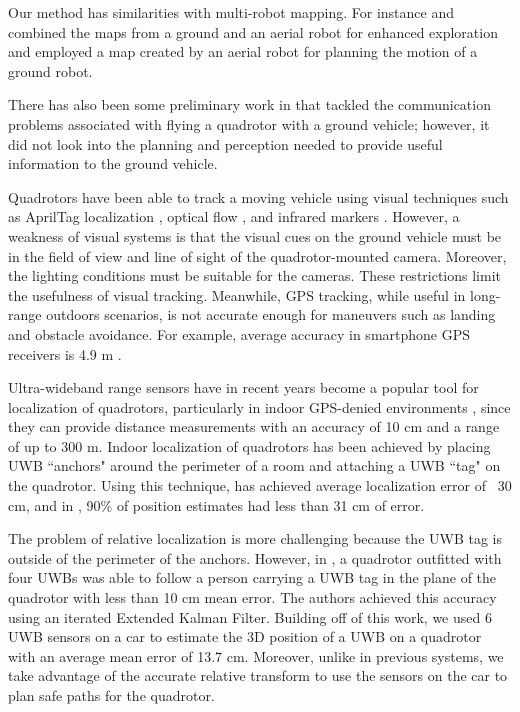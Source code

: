 Our method has similarities with multi-robot mapping. For instance \cite{Michael:2012gl} and \cite{Forster:2013kn} combined the maps from a ground and an aerial robot for enhanced exploration and \cite{Delmerico:2017vq} employed a map created by an aerial robot for planning the motion of a ground robot.

There has also been some preliminary work in \cite{nasser2015fleye} that tackled the communication problems associated with flying a quadrotor with a ground vehicle; however, it did not look into the planning and perception needed to provide useful information to the ground vehicle.



Quadrotors have been able to track a moving vehicle using visual techniques
such as AprilTag localization \cite{borowczyk2016autonomous}, optical flow \cite{herisse2012landing},
and infrared markers \cite{wenzel2011automatic}. However, a weakness of visual systems
is that the visual cues on the ground vehicle must be in the field of view and line
of sight of the quadrotor-mounted camera. Moreover, the lighting conditions must be suitable
for the cameras. These restrictions limit the usefulness of visual tracking. Meanwhile,
GPS tracking, while useful in long-range outdoors scenarios, is not accurate enough for 
maneuvers such as landing and obstacle avoidance. For example, average accuracy in
smartphone GPS receivers is 4.9 m \cite{gpsaccuracy}.

Ultra-wideband range sensors have in recent years become a popular tool for
localization of quadrotors, particularly in indoor GPS-denied environments 
\cite{liu2007survey, prorok2014, hollinger2012target, jourdan2005monte}, since they can
provide distance measurements with an accuracy of 10 cm and a range of
up to 300 m\cite{Decawave_Website}. Indoor localization of quadrotors has been
achieved by placing UWB ``anchors" around the perimeter of a room and attaching
a UWB ``tag" on the quadrotor.  Using this technique, \cite{mueller2015fusing}
has achieved average localization error of ~30 cm, and in
\cite{kempke2016harmonium}, 90\% of position estimates had less than 31 cm of error.

The problem of relative localization is more challenging because the UWB tag is outside of
the perimeter of the anchors. However, in \cite{tobiuwb}, a quadrotor
outfitted with four UWBs was able to follow a person carrying a UWB tag
in the plane of the quadrotor
with less than 10 cm mean error. The authors achieved this accuracy using an
iterated Extended Kalman Filter. Building off of this work, we used
6 UWB sensors on a car to estimate the 3D position of a UWB on a quadrotor with an
average mean error of 13.7 cm. Moreover, unlike in previous systems,
we take advantage of the accurate relative transform to use the sensors
on the car to plan safe paths for the quadrotor.

